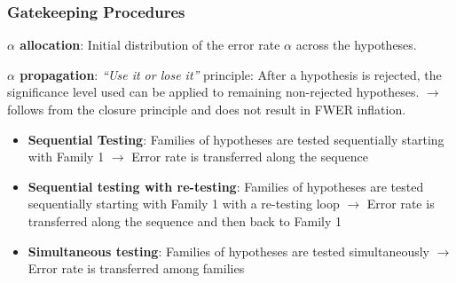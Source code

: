 \documentclass[xcolor={dvipsnames}]{beamer}
\newcommand{\rbf}[1]{\textcolor{redUnipd}{ #1}}
\begin{document}
\begin{frame}
\frametitle{Gatekeeping Procedures}


\rbf{\textbf{$\alpha$ allocation}}: Initial distribution of the error rate $\alpha$ across the hypotheses.
\medskip

\rbf{\textbf{$\alpha$ propagation}}: \emph{``Use it or lose it''} principle: After a hypothesis is rejected, the significance level used can be applied to remaining non-rejected hypotheses. $\rightarrow$ follows from the closure principle and does not result in FWER inflation.

\medskip

\begin{itemize}
    \item \textbf{Sequential Testing}: Families of hypotheses are tested sequentially starting with Family 1 $\rightarrow$ Error rate is transferred along the sequence
    \item \textbf{Sequential testing with re-testing}: Families of hypotheses are tested sequentially starting with Family 1 with a re-testing loop $\rightarrow$ Error rate is transferred along the sequence and then back to Family 1
    \item \textbf{Simultaneous testing}: Families of hypotheses are tested simultaneously $\rightarrow$ Error rate is transferred among families
\end{itemize}

    
\end{frame}
\end{document}
